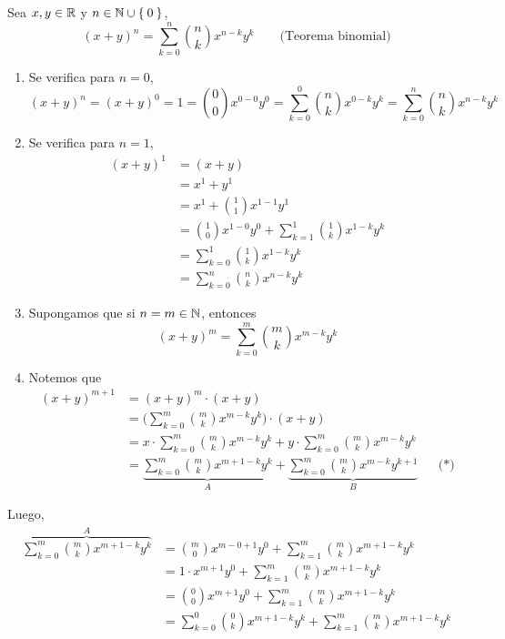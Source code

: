 Sea $x,y\in \mathbb{R}$ y $n\in \mathbb{N}\cup\Set{0}$,
\[(x+ y)^n = \sum_{k=0}^{n} \binom{n}{k} x^{n-k}y^k \qquad \text{(Teorema binomial)}\]
  \begin{enumerate}[label=\roman*)]
    \item Se verifica para $n=0$, \[(x+ y)^n = (x+ y)^0= 1= \binom{0}{0} x^{0-0}y^0= \sum_{k=0}^{0} \binom{n}{k} x^{0-k}y^k= \sum_{k=0}^{n} \binom{n}{k} x^{n-k}y^k\]
    \item Se verifica para $n=1$,
    \begin{align*}
      (x+ y)^1 &= (x+ y)\\
      &= x^1 + y^1\\
      &= x^1 + \binom{1}{1}x^{1-1}y^1\\
      &= \binom{1}{0} x^{1-0}y^0 + \sum_{k=1}^{1} \binom{1}{k} x^{1-k}y^k\\
      &= \sum_{k=0}^{1} \binom{1}{k} x^{1-k}y^k\\
      &= \sum_{k=0}^{n} \binom{n}{k} x^{n-k}y^k
    \end{align*}
    \item Supongamos que si $n=m\in \mathbb{N}$, entonces \[(x+ y)^m = \sum_{k=0}^{m} \binom{m}{k} x^{m-k}y^k\]
    \item Notemos que 
    \begin{align*}
      (x+ y)^{m+1} &= (x + y)^m \cdot (x+ y)\\
      &= \Bigg(\sum_{k=0}^{m} \binom{m}{k} x^{m-k}y^k\Bigg) \cdot (x + y)\\
      &= x \cdot \sum_{k=0}^{m} \binom{m}{k} x^{m-k}y^k + y \cdot \sum_{k=0}^{m} \binom{m}{k} x^{m-k}y^k \\
      &= \underbrace{\sum_{k=0}^{m} \binom{m}{k} x^{m+1-k}y^k}_{A} + \underbrace{\sum_{k=0}^{m} \binom{m}{k} x^{m-k}y^{k+1}}_{B} && \text{(*)}
      \end{align*}
  \end{enumerate}
Luego,
  \begin{align*}
    \overbrace{\sum_{k=0}^{m} \binom{m}{k} x^{m+1-k}y^k}^{A} &= \binom{m}{0}x^{m-0+1}y^0 +\sum_{k=1}^{m} \binom{m}{k} x^{m+1-k}y^k\\
    &= 1\cdot x^{m+1} y^0 +\sum_{k=1}^{m} \binom{m}{k} x^{m+1-k}y^k\\
    &= \binom{0}{0} x^{m+1} y^0 +\sum_{k=1}^{m} \binom{m}{k} x^{m+1-k}y^k\\
    &= \sum_{k=0}^{0} \binom{0}{k} x^{m+1-k} y^k +\sum_{k=1}^{m} \binom{m}{k} x^{m+1-k}y^k
  \end{align*}
  
